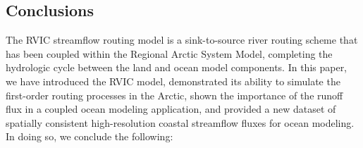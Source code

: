 \documentclass[jgrga, draft]{agutex}
\begin{document}
\begin{article}
\section{Conclusions}
\label{sec:conclusions}

The RVIC streamflow routing model is a sink-to-source river routing scheme that has been coupled within the Regional Arctic System Model, completing the hydrologic cycle between the land and ocean model components.
In this paper, we have introduced the RVIC model, demonstrated its ability to simulate the first-order routing processes in the Arctic, shown the  importance of the runoff flux in a coupled ocean modeling application, and provided a new dataset of spatially consistent high-resolution coastal streamflow fluxes for ocean modeling.
In doing so, we conclude the following:


\end{article}
\end{document}
